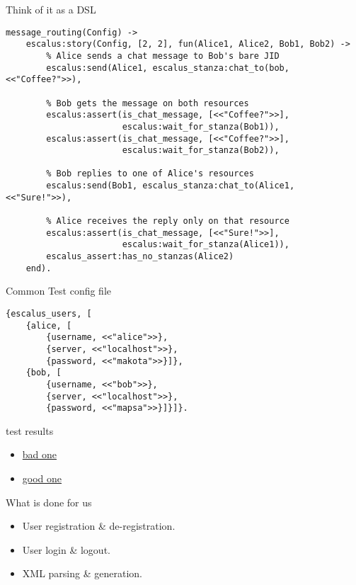 \documentclass[17pt]{beamer}
\begin{document}
\begin{frame}[fragile]{Think of it as a DSL}
\begin{verbatim}
message_routing(Config) ->
    escalus:story(Config, [2, 2], fun(Alice1, Alice2, Bob1, Bob2) ->
        % Alice sends a chat message to Bob's bare JID
        escalus:send(Alice1, escalus_stanza:chat_to(bob, <<"Coffee?">>),

        % Bob gets the message on both resources
        escalus:assert(is_chat_message, [<<"Coffee?">>],
                       escalus:wait_for_stanza(Bob1)),
        escalus:assert(is_chat_message, [<<"Coffee?">>],
                       escalus:wait_for_stanza(Bob2)),

        % Bob replies to one of Alice's resources
        escalus:send(Bob1, escalus_stanza:chat_to(Alice1, <<"Sure!">>),

        % Alice receives the reply only on that resource
        escalus:assert(is_chat_message, [<<"Sure!">>],
                       escalus:wait_for_stanza(Alice1)),
        escalus_assert:has_no_stanzas(Alice2)
    end).
\end{verbatim}
\end{frame}

\begin{frame}[fragile]{Common Test config file}
\begin{verbatim}
{escalus_users, [
    {alice, [
        {username, <<"alice">>},
        {server, <<"localhost">>},
        {password, <<"makota">>}]},
    {bob, [
        {username, <<"bob">>},
        {server, <<"localhost">>},
        {password, <<"mapsa">>}]}]}.
\end{verbatim}
\end{frame}

\begin{frame}{test results}
\begin{itemize}
\item \href{https://ci.erlang-solutions.com/job/ejabberd-esl/19/CT_Report/}{bad one}
\item \href{https://ci.erlang-solutions.com/job/ejabberd-esl/20/CT_Report/}{good one}
\end{itemize}
\end{frame}


\begin{frame}{What is done for us}
\begin{itemize}
\item User registration \& de-registration.
\item User login \& logout.
\item XML parsing \& generation.
\end{itemize}
\end{frame}
\end{document}
